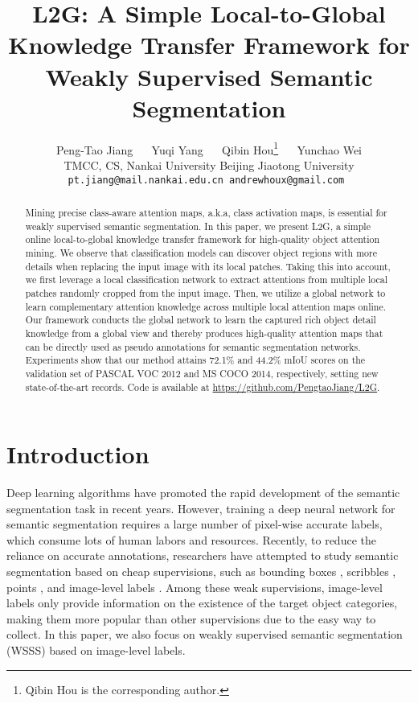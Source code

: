 \documentclass[10pt,twocolumn,letterpaper]{article}
\begin{document}
\title{L2G: A Simple Local-to-Global Knowledge Transfer Framework for \\ Weakly Supervised Semantic Segmentation}

\author{
  Peng-Tao Jiang ~~ Yuqi Yang ~~ Qibin Hou\thanks{Qibin Hou is the corresponding author.}  ~~ Yunchao Wei \\
TMCC, CS, Nankai University \quad
Beijing Jiaotong University \\
{\tt\small pt.jiang@mail.nankai.edu.cn  
andrewhoux@gmail.com }}


\maketitle


\begin{abstract}
Mining precise class-aware attention maps, a.k.a, class activation maps, 
is essential for weakly supervised semantic segmentation.
In this paper, we present L2G, a simple online local-to-global 
knowledge transfer framework for high-quality object attention mining.
We observe that classification models can discover 
object regions with more details 
when replacing the input image with its local patches.
Taking this into account, we first leverage a local classification network
to extract attentions from multiple local patches randomly cropped from
the input image.
Then, we utilize a global network to learn complementary 
attention knowledge across multiple local attention maps online.
Our framework conducts the global network to learn the captured
rich object detail knowledge from a global view and thereby
produces high-quality attention maps that can be directly 
used as pseudo annotations for semantic segmentation networks.
Experiments show that our method attains 72.1\% and 44.2\% mIoU scores
on the validation set of PASCAL VOC 2012 and MS COCO 2014, respectively, 
setting new state-of-the-art records.
Code is available at \url{https://github.com/PengtaoJiang/L2G}.
\end{abstract}


\section{Introduction} \label{sec:intro}
Deep learning algorithms \cite{long2015fully,lin2016refinenet,zhao2016pyramid} 
have promoted the rapid development of the semantic segmentation task 
in recent years. 
However, training a deep neural network for semantic segmentation requires 
a large number of pixel-wise accurate labels, which consume lots of human labors
and resources.
Recently, to reduce the reliance on accurate annotations,
researchers have attempted to study semantic segmentation 
based on cheap supervisions, 
such as bounding boxes \cite{papandreou2015weakly,dai2015boxsup}, 
scribbles \cite{lin2016scribblesup,vernaza2017learning}, points \cite{bearman2016s}, 
and image-level labels \cite{wei2017object,hou2016mining}.
Among these weak supervisions, image-level labels only provide information on
the existence of the target object categories, making them more popular
than other supervisions due to the easy way to collect.
In this paper, we also focus on weakly supervised semantic segmentation (WSSS) 
based on image-level labels.
\end{document}
